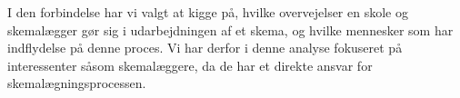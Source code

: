 I den forbindelse har vi valgt at kigge på, hvilke overvejelser en skole og skemalægger gør sig i udarbejdningen af et skema, og hvilke mennesker som har indflydelse på denne proces. Vi har derfor i denne analyse fokuseret på interessenter såsom skemalæggere, da de har et direkte ansvar for skemalægningsprocessen.





